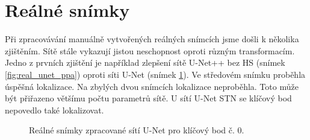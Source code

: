 \section{Reálné snímky}
\label{sec:Chapter64}
Při zpracovávání manuálně vytvořených reálných snímcích jsme došli k několika zjištěním. Sítě stále vykazují jistou neschopnost oproti různým transformacím. Jedno z prvních zjištění je například zlepšení sítě U-Net++ bez HS (snímek \ref{fig:real_unet_ppa}) oproti síti U-Net (snímek \ref{fig:real_unet_a}). Ve středovém snímku proběhla úspěšná lokalizace. Na zbylých dvou snímcích lokalizace neproběhla. Toto může být přiřazeno většímu počtu parametrů sítě. U sítí U-Net STN se klíčový bod nepovedlo také lokalizovat.
\begin{figure}[H]
\centering

\newcommand{\subfiguresize}{.15\textwidth}
\newcommand{\imagewidth}{1.0in}
\newcommand{\hspacesize}{.00in}

\newcommand{\insertimage}[1]{%
  \begin{minipage}{\imagewidth}
    \centering
    \texttt{[image: \#1]}
  \end{minipage}
}

\hspace{\hspacesize}%
\hspace{\hspacesize}%
\caption[Reálné snímky zpracované sítí U-Net]
{Reálné snímky zpracované sítí U-Net pro klíčový bod č. 0. }
\label{fig:real_unet_a}
\end{figure}


